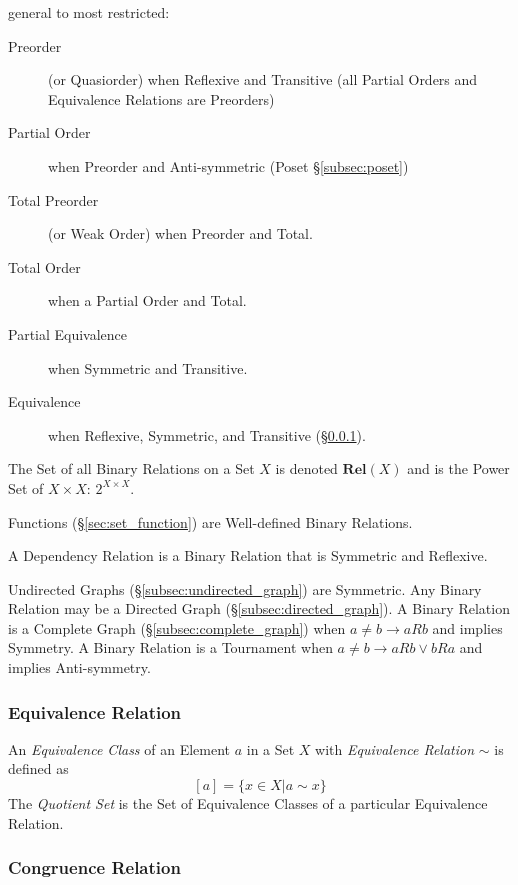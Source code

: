 \documentclass{article}
\begin{document}
general to most restricted:
\begin{description}
\item[Preorder] (or Quasiorder) when Reflexive and Transitive (all
  Partial Orders and Equivalence Relations are Preorders)
\item[Partial Order] when Preorder and Anti-symmetric (Poset
  \S\ref{subsec:poset})
\item[Total Preorder] (or Weak Order) when Preorder and Total.
\item[Total Order] when a Partial Order and Total.
\item[Partial Equivalence] when Symmetric and Transitive.
\item[Equivalence] when Reflexive, Symmetric, and Transitive
  (\S\ref{subsec:equivalence_relation}).
\end{description}

The Set of all Binary Relations on a Set $X$ is denoted
$\mathbf{Rel}(X)$ and is the Power Set of $X \times X$: $2^{X \times
  X}$.

Functions (\S\ref{sec:set_function}) are Well-defined Binary Relations.

A Dependency Relation is a Binary Relation that is Symmetric and
Reflexive.

Undirected Graphs (\S\ref{subsec:undirected_graph}) are Symmetric.
Any Binary Relation may be a Directed Graph
(\S\ref{subsec:directed_graph}). A Binary Relation is a Complete Graph
(\S\ref{subsec:complete_graph}) when $a \neq b \rightarrow aRb$ and
implies Symmetry. A Binary Relation is a Tournament when $a \neq b
\rightarrow aRb \vee bRa$ and implies Anti-symmetry.



\subsubsection{Equivalence Relation}\label{subsec:equivalence_relation}

An \emph{Equivalence Class} of an Element $a$ in a Set $X$ with
\emph{Equivalence Relation} $\sim$ is defined as
\[
    [a] = \{x \in X | a \sim x\}
\]
The \emph{Quotient Set} is the Set of Equivalence Classes of a
particular Equivalence Relation.



\subsubsection{Congruence Relation}\label{subsec:congruence_relation}
\end{document}

